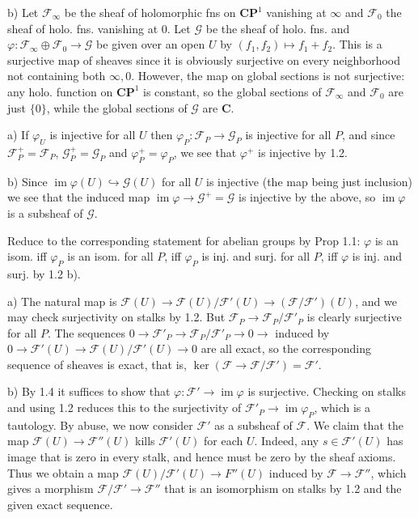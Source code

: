 \documentclass{report}
\DeclareMathOperator{\im}{im}
\newcommand{\F}{\mathcal{F}}
\newcommand{\G}{\mathcal{G}}
\begin{document}
\noindent
b)  Let $\F_{\infty}$ be the sheaf of holomorphic fns on $\mathbf{CP}^1$ vanishing at $\infty$ 
and $\F_0$ the sheaf of holo. fns. vanishing at $0$.  Let $\G$ be the sheaf of holo.
fns. and $\varphi:\F_{\infty}\oplus\F_0\rightarrow \G$ be given over
an open $U$ by $(f_1,f_2)\mapsto f_1+f_2$.  This is a surjective map of sheaves since it
is obviously surjective on every neighborhood not containing both $\infty,0$.  However,
the map on global sections is not surjective: any holo. function on $\mathbf{CP}^1$ is constant,
so the global sections of $\F_{\infty}$ and $\F_{0}$ are just $\{0\}$, while the global sections
of $\G$ are $\mathbf{C}$.

\bigskip
{}	a)  If $\varphi_U$ is injective for all $U$ then $\varphi_P:\F_P\rightarrow\G_P$ is injective for all $P$,
and since $\F^+_P=\F_P$, $\G^+_P=\G_P$ and $\varphi^+_P=\varphi_P$,
we see that $\varphi^+$ is injective by 1.2.

\noindent
b)  Since $\im \varphi(U)\hookrightarrow \G(U)$ for all $U$ is injective (the map being just inclusion)
we see that the induced map $\im\varphi\rightarrow \G^+=\G$ is injective by the above,
so $\im\varphi$ is a subsheaf of $\G$.

\bigskip
{}  Reduce to the corresponding statement for abelian groups by Prop 1.1: $\varphi$ is an isom. iff
$\varphi_P$ is an isom. for all $P$, iff $\varphi_P$ is inj. and surj. for all $P$, iff $\varphi$ is inj. and surj.
by 1.2 b).

\bigskip
{}  a)  The natural map is $\F(U)\rightarrow \F(U)/\F'(U)\rightarrow (\F/\F')(U)$,
and we may check surjectivity on stalks by 1.2.  But $\F_P\rightarrow \F_P/\F'_P$ is 
clearly surjective for all $P$.  The sequences $0\rightarrow \F'_P\rightarrow \F_P/\F'_P\rightarrow 0\rightarrow$
induced by 
$0\rightarrow \F'(U)\rightarrow \F(U)/\F'(U)\rightarrow 0$ are all exact,
so the corresponding sequence of sheaves is exact, that is, $\ker (\F\rightarrow \F/\F')=\F'$.

\noindent
b)  By 1.4 it suffices to show that $\varphi:\F'\rightarrow \im\varphi$ is surjective.  Checking on 
stalks and using 1.2 reduces this to the surjectivity of $\F'_P\rightarrow \im \varphi_P$, which
is a tautology.  By abuse, we now consider $\F'$ as a subsheaf of $\F$.
We claim that the map $\F(U)\rightarrow \F''(U)$ kills $\F'(U)$ for each $U$.  Indeed, 
any $s\in \F'(U)$ has image that is zero in every stalk, and hence must be zero by the sheaf axioms.
Thus we obtain a map $\F(U)/\F'(U)\rightarrow F''(U)$ induced by $\F\rightarrow\F''$, which gives a morphism
$\F/\F'\rightarrow \F''$ that is an isomorphism on stalks by 1.2 and the given exact sequence.
\end{document}
